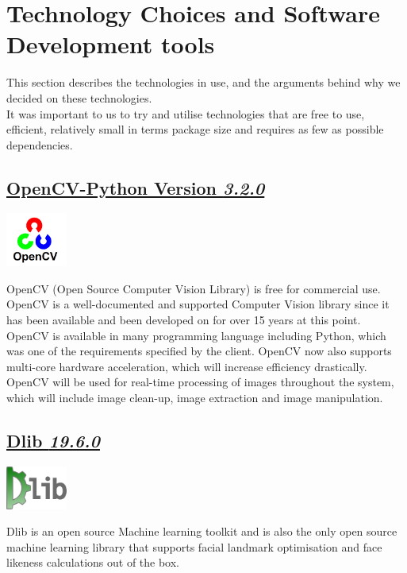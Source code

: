 \documentclass{article}
\begin{document}
		\section{Technology Choices and Software Development tools}
		This section describes the technologies in use, and the
		arguments behind why we decided on these technologies.\\
		It was important to us to try and utilise technologies that are
		free to use, efficient, relatively small in terms package size and
		requires as few as possible dependencies.
		

		\begin{minipage}[b]{0.50\linewidth}
		\subsection{ 	
			\href{https://github.com/skvark/opencv-python}	{OpenCV-Python Version \textit{3.2.0}}}
		\vspace{5mm}
		\end{minipage}
		\begin{minipage}[b]{0.50\linewidth}
			\includegraphics[width=2.0cm]{img/opencv-logo.png}
		\end{minipage}
		OpenCV (Open Source Computer Vision Library) is free for commercial use.
		OpenCV is a well-documented and supported Computer Vision library
		since it has been available and been developed on for over 15 years at this point.
		OpenCV is available in many programming language
		including Python, which was one of the requirements specified by the client.
		OpenCV now also supports multi-core hardware acceleration, which will
		increase efficiency drastically. \\

		\noindent
		OpenCV will be used for real-time processing of images throughout the system,
		which will include image clean-up, image extraction and image manipulation.\\
		
		\begin{minipage}[b]{0.25\linewidth}
		\subsection{\href{http://dlib.net/}{Dlib \textit{19.6.0}}}
		\vspace{5mm}
		\end{minipage}
		\begin{minipage}[b]{0.75\linewidth}
			\includegraphics[width=2.0cm]{img/Dlib.png}
		\end{minipage}
		Dlib is an open source Machine learning toolkit and is also
		the only open source machine learning library that supports facial landmark
		optimisation and face likeness calculations out of the box.\\ 
\end{document}
